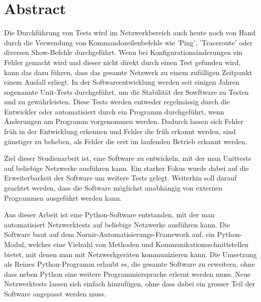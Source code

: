 \documentclass[]{subfiles}
\begin{document}
\section*{Abstract}
    Die Durchführung von Tests wird im Netzwerkbereich auch heute noch von Hand durch die Verwendung
    von Kommandozeilenbefehle wie 'Ping', 'Traceroute' oder diversen Show-Befehle durchgeführt.
    Wenn bei Konfigurationsänderungen ein Fehler gemacht wird und dieser nicht direkt durch
    einen Test gefunden wird, kann das dazu führen, dass das gesamte Netzwerk zu einem 
    zufälligen Zeitpunkt einem Ausfall erliegt.
    In der Softwareentwicklung werden seit einigen Jahren sogenannte Unit-Tests durchgeführt,
    um die Stabilität der Sowftware zu Testen und zu gewährleisten.
    Diese Tests werden entweder regelmässig durch die Entwickler oder automatisiert durch
    ein Programm durchgeführt, wenn Änderungen am Programm vorgenommen werden.
    Dadurch lassen sich Fehler früh in der Entwicklung erkennen und Fehler die früh erkannt 
    werden, sind günstiger zu beheben, als Fehler die erst im laufenden Betrieb erkannt werden.

    Ziel dieser Studienarbeit ist, eine Software zu entwickeln, mit der man Unittests
    auf beliebige Netzwerke ausführen kann. 
    Ein starker Fokus wurde dabei auf die Erweiterbarkeit der Software um weitere Tests gelegt.
    Weiterhin soll darauf geachtet werden, dass die Software möglichst unabhängig von externen
    Programmen ausgeführt werden kann.

    Aus dieser Arbeit ist eine Python-Software entstanden, mit der man automatisiert Netzwerktests
    auf beliebige Netzwerke ausführen kann.
    Die Software baut auf dem Nornir-Automatisierungs-Framework auf, ein Python-Modul, welches
    eine Vielzahl von Methoden und Kommunikationsschnittstellen bietet, 
    mit denen man mit Netzwerkgeräten kommunizieren kann.
    Die Umsetzung als Reines Python-Programm erlaubt es, die gesamte Software zu erweitern, 
    ohne dass neben Python eine weitere Programmiersprache erlernt werden muss.
    Neue Netzwerktests lassen sich einfach hinzufügen, ohne dass dabei ein grosser Teil der 
    Software angepasst werden muss.



    
\end{document}

